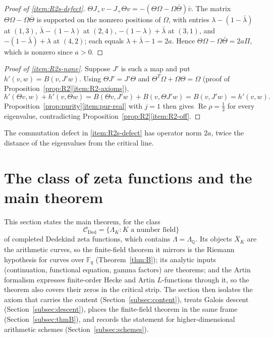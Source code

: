 \documentclass[11pt]{amsart}
\theoremstyle{plain}
\theoremstyle{definition}
\theoremstyle{remark}
\numberwithin{equation}{section}
\newcommand{\Q}{\mathbb{Q}}
\newcommand{\F}{\mathbb{F}}
\newcommand{\Xbar}{\overline{X}}
\newcommand{\cC}{\mathcal{C}}
\DeclareMathOperator{\Rea}{Re}
\renewcommand{\Re}{\Rea}
\begin{document}
\begin{proof}[Proof of \ref{item:R2s-defect}]
$\Theta J_+v-J_+\Theta v=-(\Theta\Omega-\Omega\bar\Theta)\bar v$. The
matrix $\Theta\Omega-\Omega\bar\Theta$ is supported on the nonzero
positions of $\Omega$, with entries
$\lambda-(1-\bar\lambda)$ at $(1,3)$,
$\bar\lambda-(1-\lambda)$ at $(2,4)$,
$-(1-\lambda)+\bar\lambda$ at $(3,1)$, and
$-(1-\bar\lambda)+\lambda$ at $(4,2)$; each equals
$\lambda+\bar\lambda-1=2a$. Hence $\Theta\Omega-\Omega\bar\Theta=2a\Pi$,
which is nonzero since $a>0$.
\end{proof}

\begin{proof}[Proof of \ref{item:R2s-none}]
Suppose $J'$ is such a map and put $h'(v,w)=B(v,J'w)$. Using
$\Theta J'=J'\Theta$ and $\Theta^T\Omega+\Omega\Theta=\Omega$ (proof of
Proposition~\ref{prop:R2}\ref{item:R2-axioms}),
\[
h'(\Theta v,w)+h'(v,\Theta w)=B(\Theta v,J'w)+B(v,\Theta J'w)
=B(v,J'w)=h'(v,w).
\]
Proposition~\ref{prop:purity}\ref{item:pur-real} with $j=1$ then gives
$\Re\rho=\tfrac12$ for every eigenvalue, contradicting
Proposition~\ref{prop:R2}\ref{item:R2-off}.
\end{proof}

The commutation defect in \ref{item:R2s-defect} has operator norm $2a$,
twice the distance of the eigenvalues from the critical line.

\section{The class of zeta functions and the main theorem}
\label{sec:class}

This section states the main theorem, for the class
\[
\cC_{\mathrm{Ded}}=\{\Lambda_K: K\text{ a number field}\}
\]
of completed Dedekind zeta functions, which contains
$\Lambda=\Lambda_\Q$. Its objects $\Xbar_K$ are the arithmetic curves,
so the finite-field theorem it mirrors is the Riemann hypothesis for
curves over $\F_q$ (Theorem~\ref{thm:B}); its analytic inputs
(continuation, functional equation, gamma factors) are theorems; and
the Artin formalism expresses finite-order Hecke and Artin $L$-functions
through it, so the theorem also covers their zeros in the critical strip.
The
section then isolates the axiom that carries the content
(Section~\ref{subsec:content}), treats Galois descent
(Section~\ref{subsec:descent}), places the finite-field theorem in the
same frame (Section~\ref{subsec:thmB}), and records the statement for
higher-dimensional arithmetic schemes (Section~\ref{subsec:schemes}).
\end{document}
